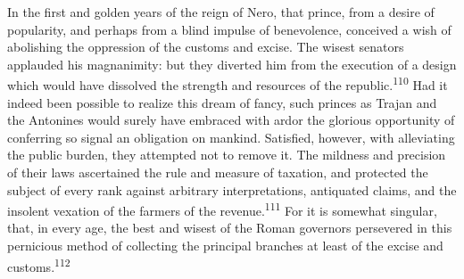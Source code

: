 



In the first and golden years of the reign of Nero, that prince,
from a desire of popularity, and perhaps from a blind impulse of
benevolence, conceived a wish of abolishing the oppression of the
customs and excise. The wisest senators applauded his
magnanimity: but they diverted him from the execution of a design
which would have dissolved the strength and resources of the
republic.\textsuperscript{110} Had it indeed been possible to realize this dream
of fancy, such princes as Trajan and the Antonines would surely
have embraced with ardor the glorious opportunity of conferring
so signal an obligation on mankind. Satisfied, however, with
alleviating the public burden, they attempted not to remove it.
The mildness and precision of their laws ascertained the rule and
measure of taxation, and protected the subject of every rank
against arbitrary interpretations, antiquated claims, and the
insolent vexation of the farmers of the revenue.\textsuperscript{111} For it is
somewhat singular, that, in every age, the best and wisest of the
Roman governors persevered in this pernicious method of
collecting the principal branches at least of the excise and
customs.\textsuperscript{112}




